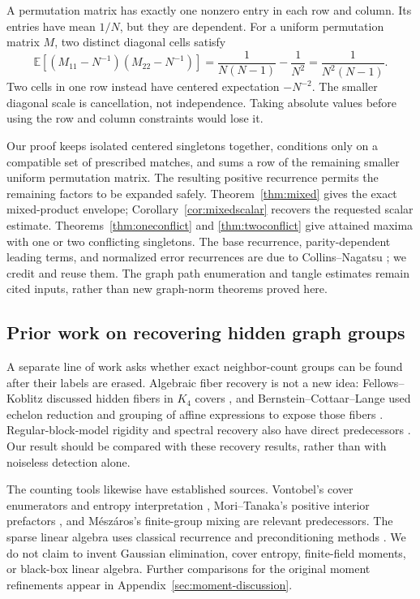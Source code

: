 \documentclass[11pt]{article}
\theoremstyle{definition}
\theoremstyle{remark}
\newcommand{\E}{\mathbb E}
\newcommand{\1}{\mathbf 1}
\begin{document}
A permutation matrix has exactly one nonzero entry in each row and
column. Its entries have mean $1/N$, but they are dependent. For a
uniform permutation matrix $M$, two distinct diagonal cells satisfy
\begin{equation}\label{eq:two}
\E[(M_{11}-N^{-1})(M_{22}-N^{-1})]
=\frac{1}{N(N-1)}-\frac1{N^2}
=\frac{1}{N^2(N-1)}.
\end{equation}
Two cells in one row instead have centered expectation $-N^{-2}$.
The smaller diagonal scale is cancellation, not independence. Taking
absolute values before using the row and column constraints would lose it.

Our proof keeps isolated centered singletons together, conditions only
on a compatible set of prescribed matches, and sums a row of the
remaining smaller uniform permutation matrix. The resulting positive
recurrence permits the remaining factors to be expanded safely.
Theorem~\ref{thm:mixed} gives the exact mixed-product envelope;
Corollary~\ref{cor:mixedscalar} recovers the requested scalar estimate.
Theorems~\ref{thm:oneconflict} and \ref{thm:twoconflict} give attained
maxima with one or two conflicting singletons. The base recurrence,
parity-dependent leading terms, and normalized error recurrences are due
to Collins--Nagatsu \cite[Proposition 3.3]{CN}; we credit and reuse them.
The graph path enumeration and tangle estimates remain cited inputs,
rather than new graph-norm theorems proved here.

\subsection{Prior work on recovering hidden graph groups}
A separate line of work asks whether exact neighbor-count groups can be
found after their labels are erased. Algebraic fiber recovery is not a
new idea: Fellows--Koblitz discussed hidden fibers in $K_4$ covers
\cite{rec:KidKrypto}, and Bernstein--Cottaar--Lange used echelon
reduction and grouping of affine expressions to expose those fibers
\cite{rec:BCL}. Regular-block-model rigidity and spectral recovery
also have direct predecessors \cite{rec:BDGHT,rec:Barucca,rec:KP,BDH}.
Our result should be compared with these recovery results, rather than
with noiseless detection alone.

The counting tools likewise have established sources. Vontobel's
cover enumerators and entropy interpretation \cite{rec:Vontobel},
Mori--Tanaka's positive interior prefactors \cite{rec:MoriTanaka},
and M\'esz\'aros's finite-group mixing \cite{rec:Meszaros} are relevant
predecessors. The sparse linear algebra uses classical recurrence and
preconditioning methods \cite{rec:Wiedemann,rec:Chen}. We do not claim
to invent Gaussian elimination, cover entropy, finite-field moments,
or black-box linear algebra. Further comparisons for the original
moment refinements appear in Appendix~\ref{sec:moment-discussion}.
\end{document}
